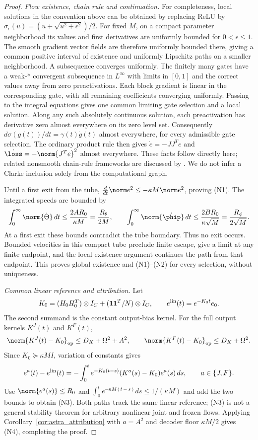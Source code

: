 \begin{proof}
\emph{Flow existence, chain rule and continuation.}
For completeness, local solutions in the convention above can be
obtained by replacing ReLU by
$\sigma_\epsilon(u)=(u+\sqrt{u^2+\epsilon^2})/2$.
For fixed $M$, on a compact parameter neighborhood its values and
first derivatives are uniformly bounded for $0<\epsilon\le1$.
The smooth gradient vector fields are therefore uniformly bounded
there, giving a common positive interval of existence and uniformly
Lipschitz paths on a smaller neighborhood. A subsequence converges
uniformly. The finitely many gates have a weak-* convergent subsequence
in $L^\infty$ with limits in $[0,1]$ and the correct values away from
zero preactivations. Each block gradient is linear in the corresponding
gate, with all remaining coefficients converging uniformly. Passing
to the integral equations gives one common limiting gate selection
and a local solution.
Along any such absolutely continuous solution, each preactivation
has derivative zero almost everywhere on its zero level set.
Consequently $d\sigma(g(t))/dt=\gamma(t)\dot g(t)$ almost everywhere,
for every admissible gate selection. The ordinary product rule then
gives $\dot e=-JJ^Te$ and
$\dot\loss=-\norm{J^Te}^2$ almost everywhere. These facts follow
directly here; related nonsmooth chain-rule frameworks are discussed
by \citet{astra_davis2020,astra_bolte2021}. We do not infer a Clarke
inclusion solely from the computational graph.

Until a first exit from the tube,
$\frac d{dt}\norm e^2\le-\kappa M\norm e^2$, proving (N1).
The integrated speeds are bounded by
\[
 \int_0^\infty\norm{\dot\Theta}\,dt\le\frac{2AR_0}{\kappa M}
     =\frac{R_\theta}{2M},\qquad
 \int_0^\infty\norm{\dot\phip}\,dt
     \le\frac{2BR_0}{\kappa\sqrt M}
     =\frac{R_\phi}{2\sqrt M}.
\]
At a first exit these bounds contradict the tube boundary. Thus no
exit occurs. Bounded velocities in this compact tube preclude finite
escape, give a limit at any finite endpoint, and the local existence
argument continues the path from that endpoint. This proves global
existence and (N1)--(N2) for every selection, without uniqueness.

\emph{Common linear reference and attribution.}
Let
\[
 K_0=(H_0H_0^T)\otimes I_C+
             (\mathbf1\mathbf1^T/N)\otimes I_C,
 \qquad e^{\rm lin}(t)=e^{-K_0t}e_0.
\]
The second summand is the constant output-bias kernel.
For the full output kernels $K^J(t)$ and $K^F(t)$,
\[
 \norm{K^J(t)-K_0}_{\rm op}\le D_K+\Omega^2+A^2,
 \qquad
 \norm{K^F(t)-K_0}_{\rm op}\le D_K+\Omega^2.
\]
Since $K_0\succeq\kappa MI$, variation of constants gives
\[
 e^a(t)-e^{\rm lin}(t)
 =-\int_0^t e^{-K_0(t-s)}(K^a(s)-K_0)e^a(s)\,ds,
 \qquad a\in\{J,F\}.
\]
Use $\norm{e^a(s)}\le R_0$ and
$\int_0^te^{-\kappa M(t-s)}ds\le1/(\kappa M)$ and add the two
bounds to obtain (N3). Both paths track the same linear reference;
(N3) is not a general stability theorem for arbitrary nonlinear
joint and frozen flows. Applying
Corollary~\ref{cor:astra_attribution} with $a=A^2$ and decoder floor
$\kappa M/2$ gives (N4), completing the proof.
\end{proof}

